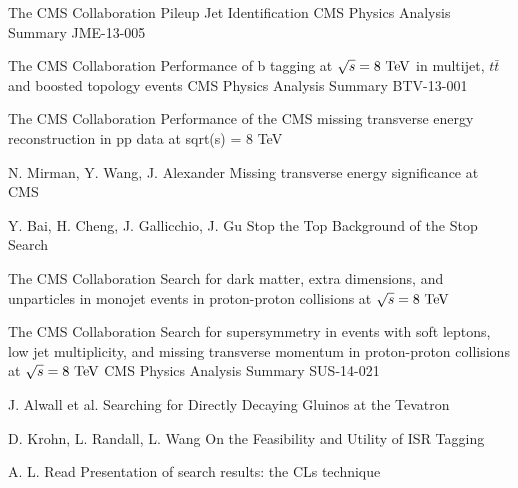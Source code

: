 \begin{thebibliography}{2}
             {The CMS Collaboration}
             {Pileup Jet Identification}
             {CMS Physics Analysis Summary JME-13-005}

             {The CMS Collaboration}
             {Performance of b tagging at $\sqrt{s} = 8~\text{TeV}$ in multijet, $t\bar{t}$ and
             boosted topology events}
             {CMS Physics Analysis Summary BTV-13-001}

             {The CMS Collaboration}
             {Performance of the CMS missing transverse energy reconstruction in pp data at sqrt(s) = 8 TeV}
             {}


             {N. Mirman, Y. Wang, J. Alexander}
             {Missing transverse energy significance at CMS}
             {}

             {Y. Bai, H. Cheng, J. Gallicchio, J. Gu}
             {Stop the Top Background of the Stop Search}
             {}


             {The CMS Collaboration}
             {Search for dark matter, extra dimensions, and unparticles in monojet events in proton-proton collisions at $\sqrt{s} = 8~\text{TeV}$}
             {}

             {The CMS Collaboration}
             {Search for supersymmetry in events with soft leptons, low
             jet multiplicity, and missing transverse momentum in
             proton-proton collisions at $\sqrt{s} = 8~\text{TeV}$}
             {CMS Physics Analysis Summary SUS-14-021}

             {J. Alwall et al.}
             {Searching for Directly Decaying Gluinos at the Tevatron}
             {}

             {D. Krohn, L. Randall, L. Wang}
             {On the Feasibility and Utility of ISR Tagging}
             {}


             {A. L. Read}
             {Presentation of search results: the CLs technique}
             {}


\end{thebibliography}
